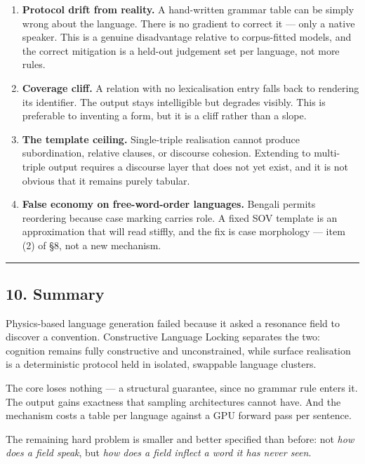 \documentclass[
  11pt,
  a4paper,
]{article}
\begin{document}
\begin{enumerate}
\def\labelenumi{\arabic{enumi}.}
\item
  \textbf{Protocol drift from reality.} A hand-written grammar table can
  be simply wrong about the language. There is no gradient to correct it
  --- only a native speaker. This is a genuine disadvantage relative to
  corpus-fitted models, and the correct mitigation is a held-out
  judgement set per language, not more rules.
\item
  \textbf{Coverage cliff.} A relation with no lexicalisation entry falls
  back to rendering its identifier. The output stays intelligible but
  degrades visibly. This is preferable to inventing a form, but it is a
  cliff rather than a slope.
\item
  \textbf{The template ceiling.} Single-triple realisation cannot
  produce subordination, relative clauses, or discourse cohesion.
  Extending to multi-triple output requires a discourse layer that does
  not yet exist, and it is not obvious that it remains purely tabular.
\item
  \textbf{False economy on free-word-order languages.} Bengali permits
  reordering because case marking carries role. A fixed SOV template is
  an approximation that will read stiffly, and the fix is case
  morphology --- item (2) of §8, not a new mechanism.
\end{enumerate}

\begin{center}\rule{0.5\linewidth}{0.5pt}\end{center}

\subsection{10. Summary}\label{summary}

Physics-based language generation failed because it asked a resonance
field to discover a convention. Constructive Language Locking separates
the two: cognition remains fully constructive and unconstrained, while
surface realisation is a deterministic protocol held in isolated,
swappable language clusters.

The core loses nothing --- a structural guarantee, since no grammar rule
enters it. The output gains exactness that sampling architectures cannot
have. And the mechanism costs a table per language against a GPU forward
pass per sentence.

The remaining hard problem is smaller and better specified than before:
not \emph{how does a field speak}, but \emph{how does a field inflect a
word it has never seen}.
\end{document}
